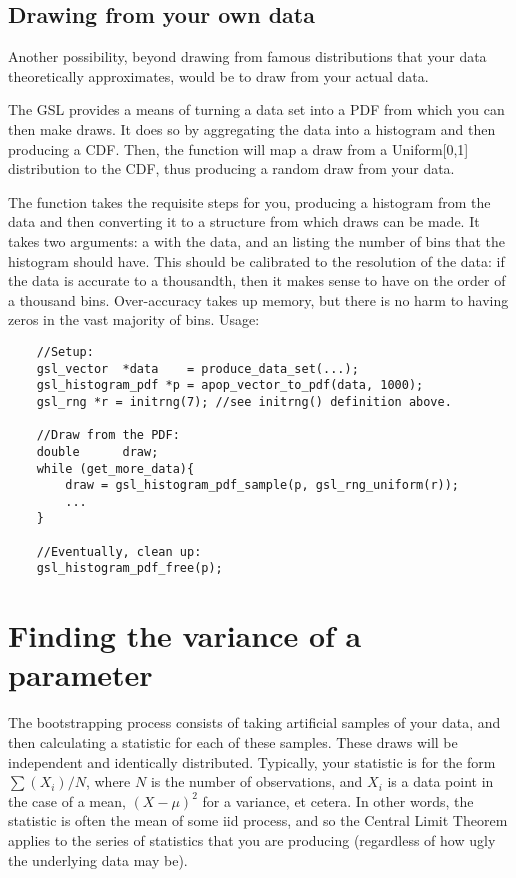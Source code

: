 \subsection{Drawing from your own data} 
Another possibility, beyond
drawing from famous distributions that your data theoretically
approximates, would be to draw from your actual data. 

The GSL provides a means of turning a data set into a PDF from which you
can then make draws.  It
does so by aggregating the data into a histogram and then producing a CDF.
Then, the  function will
map a draw from a Uniform[0,1] distribution to the CDF, thus producing a
random draw from your data.

The  function takes the requisite steps
for you, producing a histogram from the data and then converting it to
a  structure from which draws can be
made. It takes two arguments: a  with the data, and
an  listing the number of bins that the histogram should
have. This should be calibrated to the resolution of the data: if the
data is accurate to a thousandth, then it makes sense to have on the
order  of a thousand
bins. Over-accuracy takes up memory, but there is no harm to having
zeros in the vast majority of bins. Usage:
\begin{lstlisting}
    //Setup:
    gsl_vector  *data    = produce_data_set(...);
    gsl_histogram_pdf *p = apop_vector_to_pdf(data, 1000);
    gsl_rng *r = initrng(7); //see initrng() definition above.

    //Draw from the PDF:
    double      draw;
    while (get_more_data){
        draw = gsl_histogram_pdf_sample(p, gsl_rng_uniform(r));
        ...
    }

    //Eventually, clean up:
    gsl_histogram_pdf_free(p);
\end{lstlisting}


\section{Finding the variance of a parameter}
The bootstrapping process consists of taking artificial samples of your
data, and then calculating a statistic for each of these samples. These
draws will be independent and identically distributed.  Typically,
your statistic is for the form $\sum (X_i)/ N$, where  $N$ is the number
of observations, and $X_i$ is a data point in the case of a mean,
$(X-\mu)^2$ for a variance, et cetera. In other words, the statistic
is often the mean of some iid process, and so the Central Limit Theorem
applies to the series of statistics that you are producing (regardless
of how ugly the underlying data may be).

